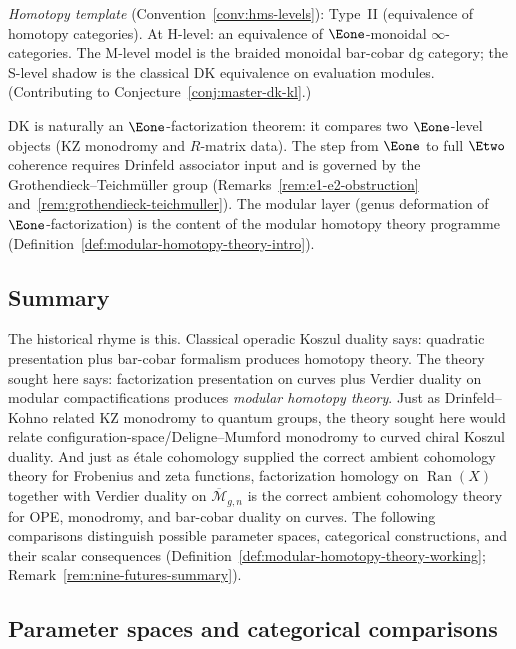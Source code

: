 \begin{remark}
\emph{Homotopy template} (Convention~\ref{conv:hms-levels}): Type~II
(equivalence of homotopy categories).  At H-level: an equivalence of
$\Eone$-monoidal $\infty$-categories.  The M-level model is the braided
monoidal bar-cobar dg category; the S-level shadow is the classical DK
equivalence on evaluation modules.
(Contributing to Conjecture~\ref{conj:master-dk-kl}.)

DK is naturally an $\Eone$-factorization theorem: it compares two
$\Eone$-level objects (KZ monodromy and $R$-matrix data).  The step
from $\Eone$ to full $\Etwo$ coherence requires Drinfeld associator
input and is governed by the Grothendieck--Teichm\"uller group
(Remarks~\ref{rem:e1-e2-obstruction}
and~\ref{rem:grothendieck-teichmuller}).  The modular layer (genus
deformation of $\Eone$-factorization) is the content of the modular
homotopy theory programme
(Definition~\ref{def:modular-homotopy-theory-intro}).
\end{remark}

\subsection{Summary}

The historical rhyme is this.  Classical operadic Koszul duality
says: quadratic presentation plus bar-cobar formalism produces
homotopy theory.  The theory sought here says: factorization
presentation on curves plus Verdier duality on modular
compactifications produces \emph{modular homotopy theory}.  Just as
Drinfeld--Kohno related KZ monodromy to quantum groups, the theory
sought here would relate configuration-space/Deligne--Mumford
monodromy to curved chiral Koszul duality.  And just as \'etale
cohomology supplied the correct ambient cohomology theory for
Frobenius and zeta functions, factorization homology on
$\operatorname{Ran}(X)$ together with Verdier duality on
$\overline{\mathcal{M}}_{g,n}$ is the correct ambient cohomology
theory for OPE, monodromy, and bar-cobar duality on curves.
The following comparisons distinguish possible parameter spaces,
categorical constructions, and their scalar consequences
(Definition~\ref{def:modular-homotopy-theory-working};
Remark~\ref{rem:nine-futures-summary}).

\subsection{Parameter spaces and categorical comparisons}\label{subsec:nine-futures}

